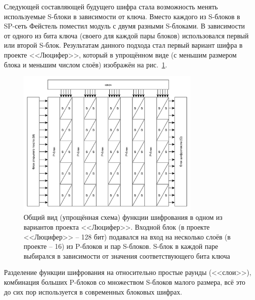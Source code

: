 Следующей составляющей будущего шифра стала возможность менять используемые S-блоки в зависимости от ключа. Вместо каждого из S-блоков в SP-сеть Фейстель поместил модуль с двумя разными S-блоками. В зависимости от одного из бита ключа (своего для каждой пары блоков) использовался первый или второй S-блок. Результатам данного подхода стал первый вариант шифра в проекте <<Люцифер>>, который в упрощённом виде (с меньшим размером блока и меньшим числом слоёв) изображён на рис.~\ref{fig:lucifer}.

\begin{figure}[htb]
	\centering
	\includegraphics[width=0.8\textwidth]{pic/lucifer}
  \caption{Общий вид (упрощённая схема) функции шифрования в одном из вариантов проекта <<Люцифер>>. Входной блок (в проекте <<Люцифер>> -- 128 бит) подавался на вход на несколько слоёв (в проекте -- 16) из P-блоков и пар S-блоков. S-блок в каждой паре выбирался в зависимости от значения соответствующего бита ключа}
  \label{fig:lucifer}
\end{figure}

Разделение функции шифрования на относительно простые раунды (<<слои>>), комбинация больших P-блоков со множеством S-блоков малого размера, всё это до сих пор используется в современных блоковых шифрах.